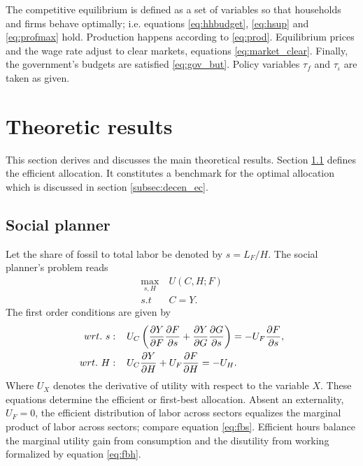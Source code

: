 The competitive equilibrium is defined as a set of variables so that households and firms behave optimally; i.e. equations \ref{eq:hhbudget}, \ref{eq:hsup} and \ref{eq:profmax} hold. Production happens according to \ref{eq:prod}.  Equilibrium prices and the wage rate adjust to clear markets, equations \ref{eq:market_clear}. Finally, the government's budgets are satisfied \ref{eq:gov_but}. Policy variables $\tau_f$ and $\tau_\iota$ are taken as given. 

\section{Theoretic results}\label{sec:theory}
This section derives and discusses the main theoretical results. Section \ref{subsec:sp} defines the efficient allocation. It constitutes a benchmark for the optimal allocation which is discussed in section \ref{subsec:decen_ec}. 
\subsection{Social planner}\label{subsec:sp}
Let the share of fossil to total labor be denoted by $s=L_F/H$. The social planner's problem reads
\begin{align}
\underset{s, H}{\max}\ & U(C,H; F)\\ s.t\ \ & C=Y.
\end{align}
The first order conditions are given by
\begin{align}
wrt.\ s:\hspace{4mm} & U_C\left(\frac{\partial{Y}}{\partial{F}}\frac{\partial{F}}{\partial{s}}+\frac{\partial{Y}}{\partial{G}}\frac{\partial{G}}{\partial{s}}\right)=-U_F\frac{\partial{F}}{\partial{s}}, \label{eq:fbs}
\\
wrt.\ H:\hspace{4mm} & U_C\frac{\partial{Y}}{\partial{H}}+U_F\frac{\partial{F}}{\partial{H}}=-U_H\label{eq:fbh}. 
\end{align}
Where $U_X$ denotes the derivative of utility with respect to the variable $X$.
These equations determine the efficient or first-best allocation. 
Absent an externality, $U_F=0$, the efficient distribution of labor across sectors equalizes the marginal product of labor across sectors; compare equation \ref{eq:fbs}. Efficient hours balance the marginal utility gain from consumption and the disutility from working formalized by equation \ref{eq:fbh}. 


